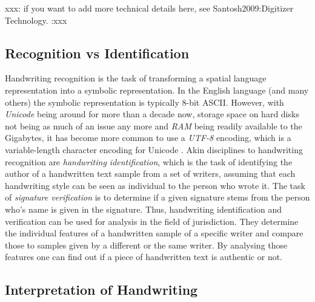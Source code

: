 xxx: if you want to add more technical details here, 
see Santosh2009:Digitizer Technology. :xxx

\subsection{Recognition vs Identification}
\label{sec:recognitionvsidentification}

Handwriting recognition is the task of transforming a spatial language 
representation into a symbolic representation. In the English language
(and many others) the symbolic representation is typically 8-bit ASCII.
However, with \emph{Unicode} being around for more than a decade now,
storage space on hard disks not being as much of an issue any more and
\emph{RAM} being readily available to the Gigabytes, it has become more 
common to use a \emph{UTF-8}  encoding, which is a variable-length character 
encoding for Unicode .
Akin disciplines to handwriting recognition are 
\emph{handwriting identification}, which is the task of identifying the author
of a handwritten text sample from a set of writers, assuming that each
handwriting style can be seen as individual to the person who wrote it.
The task of \emph{signature verification} is to determine if a given signature
stems from the person who's name is given in the signature.
Thus, handwriting identification and verification can be used for 
analysis in the field of jurisdiction. They determine the individual features
of a handwritten sample of a specific writer and compare those
to samples given by a different or the same writer. By analysing those 
features one can find out if a piece of handwritten text is authentic or not.

\subsection{Interpretation of Handwriting}
\label{sec:interpretationofhandwriting}

